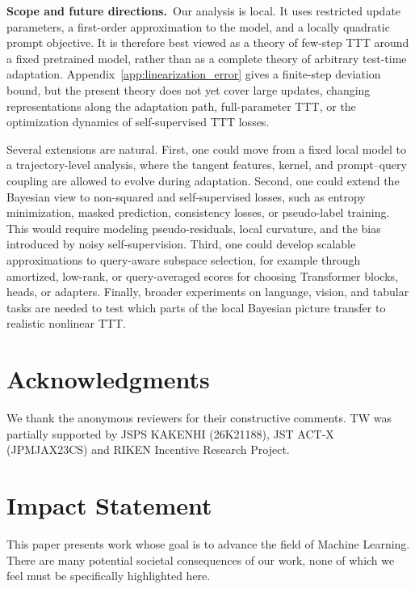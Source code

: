 \documentclass{article}
\theoremstyle{plain}
\theoremstyle{definition}
\theoremstyle{remark}
\begin{document}
\textbf{Scope and future directions.}\,
Our analysis is local. It uses restricted update parameters, a first-order approximation to the model, and a locally quadratic prompt objective. It is therefore best viewed as a theory of few-step TTT around a fixed pretrained model, rather than as a complete theory of arbitrary test-time adaptation. Appendix~\ref{app:linearization_error} gives a finite-step deviation bound, but the present theory does not yet cover large updates, changing representations along the adaptation path, full-parameter TTT, or the optimization dynamics of self-supervised TTT losses.

Several extensions are natural. First, one could move from a fixed local model to a trajectory-level analysis, where the tangent features, kernel, and prompt--query coupling are allowed to evolve during adaptation. Second, one could extend the Bayesian view to non-squared and self-supervised losses, such as entropy minimization, masked prediction, consistency losses, or pseudo-label training. This would require modeling pseudo-residuals, local curvature, and the bias introduced by noisy self-supervision. Third, one could develop scalable approximations to query-aware subspace selection, for example through amortized, low-rank, or query-averaged scores for choosing Transformer blocks, heads, or adapters. Finally, broader experiments on language, vision, and tabular tasks are needed to test which parts of the local Bayesian picture transfer to realistic nonlinear TTT.



\section*{Acknowledgments}
We thank the anonymous reviewers for their constructive comments.
TW was partially supported by JSPS KAKENHI (26K21188), JST ACT-X (JPMJAX23CS) and RIKEN Incentive Research Project.

\section*{Impact Statement}
This paper presents work whose goal is to advance the field of Machine Learning. There are many potential societal consequences of our work, none of which we feel must be specifically highlighted here.





\clearpage
\appendix
\end{document}
